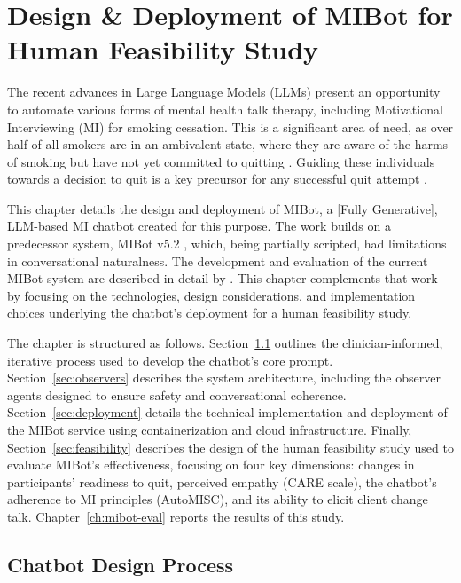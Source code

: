 \chapter{Design \& Deployment of MIBot for Human Feasibility Study}
\label{ch:mibot}

The recent advances in Large Language Models (LLMs) present an opportunity to automate various forms of mental health talk therapy, including Motivational Interviewing (MI) for smoking cessation. This is a significant area of need, as over half of all smokers are in an ambivalent state, where they are aware of the harms of smoking but have not yet committed to quitting \citep{Babb2017}. Guiding these individuals towards a decision to quit is a key precursor for any successful quit attempt \citep{West2006}.

This chapter details the design and deployment of MIBot, a [Fully Generative], LLM-based MI chatbot created for this purpose. The work builds on a predecessor system, MIBot v5.2 \citep{info:doi/10.2196/49132}, which, being partially scripted, had limitations in conversational naturalness. The development and evaluation of the current MIBot system are described in detail by \citet{mahmood-etal-2025-fully}. This chapter complements that work by focusing on the technologies, design considerations, and implementation choices underlying the chatbot's deployment for a human feasibility study.

The chapter is structured as follows. Section~\ref{sec:iterative-development} outlines the clinician-informed, iterative process used to develop the chatbot's core prompt. Section~\ref{sec:observers} describes the system architecture, including the observer agents designed to ensure safety and conversational coherence. Section~\ref{sec:deployment} details the technical implementation and deployment of the MIBot service using containerization and cloud infrastructure. Finally, Section~\ref{sec:feasibility} describes the design of the human feasibility study used to evaluate MIBot's effectiveness, focusing on four key dimensions: changes in participants' readiness to quit, perceived empathy (CARE scale), the chatbot's adherence to MI principles (AutoMISC), and its ability to elicit client change talk. Chapter~\ref{ch:mibot-eval} reports the results of this study.




\section{Chatbot Design Process}
\label{sec:iterative-development}


